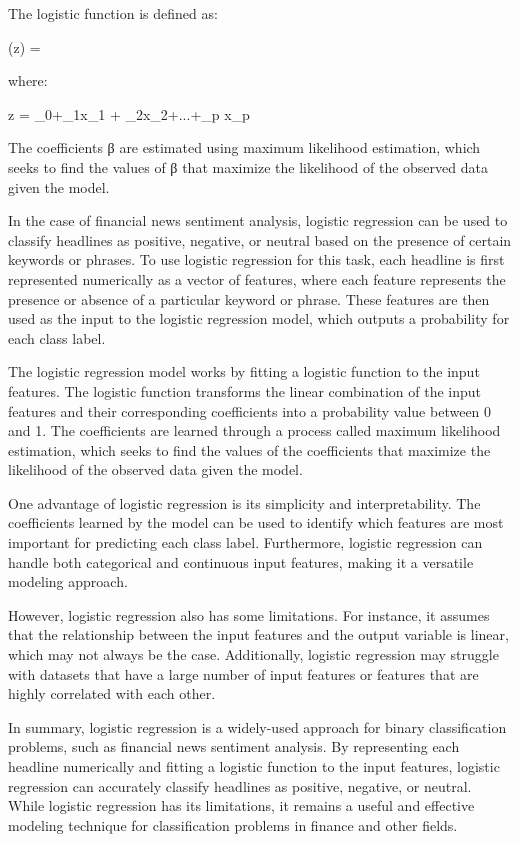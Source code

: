 \documentclass{article}
\begin{document}
The logistic function is defined as:

\sigma (z) = 

where:

z = \beta_0+\beta_1x_1 + \beta_2x_2+...+\beta_p x_p
 

The coefficients β are estimated using maximum likelihood estimation, which seeks to find the values of β that maximize the likelihood of the observed data given the model.

In the case of financial news sentiment analysis, logistic regression can be used to classify headlines as positive, negative, or neutral based on the presence of certain keywords or phrases. To use logistic regression for this task, each headline is first represented numerically as a vector of features, where each feature represents the presence or absence of a particular keyword or phrase. These features are then used as the input to the logistic regression model, which outputs a probability for each class label.

The logistic regression model works by fitting a logistic function to the input features. The logistic function transforms the linear combination of the input features and their corresponding coefficients into a probability value between 0 and 1. The coefficients are learned through a process called maximum likelihood estimation, which seeks to find the values of the coefficients that maximize the likelihood of the observed data given the model.

One advantage of logistic regression is its simplicity and interpretability. The coefficients learned by the model can be used to identify which features are most important for predicting each class label. Furthermore, logistic regression can handle both categorical and continuous input features, making it a versatile modeling approach.

However, logistic regression also has some limitations. For instance, it assumes that the relationship between the input features and the output variable is linear, which may not always be the case. Additionally, logistic regression may struggle with datasets that have a large number of input features or features that are highly correlated with each other.

In summary, logistic regression is a widely-used approach for binary classification problems, such as financial news sentiment analysis. By representing each headline numerically and fitting a logistic function to the input features, logistic regression can accurately classify headlines as positive, negative, or neutral. While logistic regression has its limitations, it remains a useful and effective modeling technique for classification problems in finance and other fields.
\end{document}
